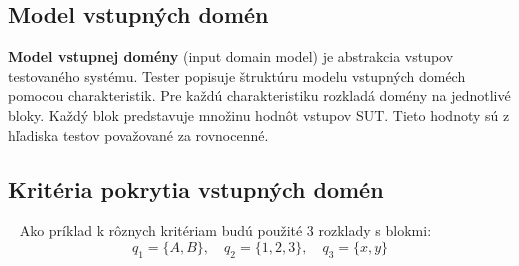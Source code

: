 \subsection*{Model vstupných domén}
\label{model_domen}
\textbf{Model vstupnej domény} (input domain model) je abstrakcia vstupov testovaného systému.
Tester popisuje štruktúru modelu vstupných doméch pomocou charakteristik.
Pre každú charakteristiku rozkladá domény na jednotlivé bloky.
Každý blok predstavuje množinu hodnôt vstupov SUT.
Tieto hodnoty sú z hľadiska testov považované za rovnocenné.

\pagebreak[3]
\subsection*{Kritéria pokrytia vstupných domén}\
\label{kriteria_pokrytia_domen}
Ako príklad k rôznych kritériam budú použité 3 rozklady s blokmi:
		\begin{equation}
			q_1 = \{A, B\},\quad q_2 = \{1, 2, 3\},\quad q_3 = \{x, y\}
		\end{equation}

